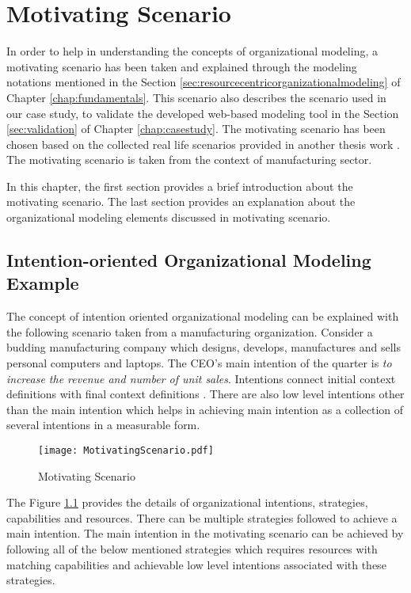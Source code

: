 \chapter{Motivating Scenario}
\label{chap:motivatingScenario}
In order to help in understanding the concepts of organizational modeling, a motivating scenario has been taken and explained through the modeling notations mentioned in the Section \ref{sec:resourcecentricorganizationalmodeling} of Chapter \ref{chap:fundamentals}. This scenario also describes the scenario used in our case study, to validate the developed web-based modeling tool in the Section \ref{sec:validation} of Chapter \ref{chap:casestudy}. The motivating scenario has been chosen based on the collected real life scenarios provided in another thesis work \cite{Sierr2015}. The motivating scenario is taken from the context of manufacturing sector. 

In this chapter, the first section provides a brief introduction about the motivating scenario. The last section provides an explanation about the organizational modeling elements discussed in motivating scenario. 
\section{Intention-oriented Organizational Modeling Example}
\label{sec:scenario}
 The concept of intention oriented organizational modeling can be explained with the following scenario taken from a manufacturing organization. Consider a budding manufacturing company which designs, develops, manufactures and sells personal computers and laptops. The CEO's main intention of the quarter is \textit{to increase the revenue and number of unit sales}. Intentions connect initial context definitions with final context definitions \cite{Sungur2014a}. There are also low level intentions other than the main intention which helps in achieving main intention as a collection of several intentions in a measurable form. 
 
  \begin{figure}
  	\centering
  	\texttt{[image: MotivatingScenario.pdf]}
  	\caption{Motivating Scenario}
  	\label{fig:motivatingscenario}
  \end{figure}
  
The Figure \ref{fig:motivatingscenario} provides the details of organizational intentions, strategies, capabilities and resources. There can be multiple strategies followed to achieve a main intention. The main intention in the motivating scenario can be achieved by following all of the below mentioned strategies which requires resources with matching capabilities and achievable low level intentions associated with these strategies. 
 

